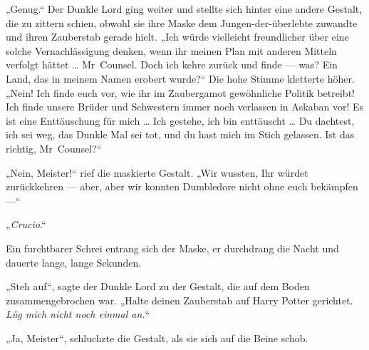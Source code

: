 „Genug.“ Der Dunkle Lord ging weiter und stellte sich hinter eine andere Gestalt, die zu zittern schien, obwohl sie ihre Maske dem Jungen-der-überlebte zuwandte und ihren Zauberstab gerade hielt.
„Ich würde vielleicht freundlicher über eine solche Vernachlässigung denken, wenn ihr meinen Plan mit anderen Mitteln verfolgt hättet … Mr~Counsel. Doch ich kehre zurück und finde — was? Ein Land, das in meinem Namen erobert wurde?“
Die hohe Stimme kletterte höher.
„Nein! Ich finde euch vor, wie ihr im Zaubergamot gewöhnliche Politik betreibt! Ich finde unsere Brüder und Schwestern immer noch verlassen in Askaban vor! Es ist eine Enttäuschung für mich … Ich gestehe, ich bin enttäuscht … Du dachtest, ich sei weg, das Dunkle Mal sei tot, und du hast mich im Stich gelassen. Ist das richtig, Mr~Counsel?“

„Nein, Meister!“ rief die maskierte Gestalt.
„Wir wussten, Ihr würdet zurückkehren — aber, aber wir konnten Dumbledore nicht ohne euch bekämpfen —“

„\emph{Crucio}.“

Ein furchtbarer Schrei entrang sich der Maske, er durchdrang die Nacht und dauerte lange, lange Sekunden.

„Steh auf“, sagte der Dunkle Lord zu der Gestalt, die auf dem Boden zusammengebrochen war.
„Halte deinen Zauberstab auf Harry Potter gerichtet. \emph{Lüg mich nicht noch einmal an.}“

„Ja, Meister“, schluchzte die Gestalt, als sie sich auf die Beine schob.

